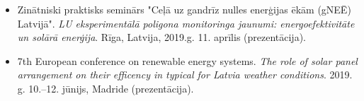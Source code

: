 \begin{itemize}
\item Zinātniski praktisks seminārs "Ceļā uz gandrīz nulles enerģijas ēkām (gNEĒ) Latvijā". \emph{LU eksperimentālā poligona monitoringa jaunumi: energoefektivitāte un solārā enerģija}. Rīga, Latvija, 2019.g. 11. aprīlis (prezentācija).
\item 7th European conference on renewable energy systems. \emph{The role of solar panel arrangement on their efficency in typical for Latvia weather conditions}. 2019. g. 10.--12. jūnijs, Madride (prezentācija).
\end{itemize}

